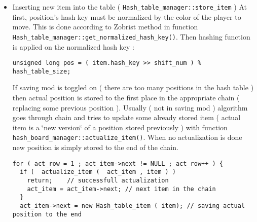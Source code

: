 \begin{itemize}
\item Inserting new item into the table ( {\tt Hash\_\-table\_\-manager::store\_\-item} ) At first, position's hash key must be normalized by the color of the player to move. This is done according to Zobrist method in function {\tt Hash\_\-table\_\-manager::get\_\-normalized\_\-hash\_\-key()}. Then hashing function is applied on the normalized hash key : 

\footnotesize\begin{verbatim}unsigned long pos = ( item.hash_key >> shift_num ) % hash_table_size;
\end{verbatim}
\normalsize
 If saving mod is toggled on ( there are too many positions in the hash table ) then actual position is stored to the first place in the appropriate chain ( replacing some previous position ). Usually ( not in saving mod ) algorithm goes through chain and tries to update some already stored item ( actual item is a \char`\"{}new version\char`\"{} of a position stored previously ) with function {\tt hash\_\-board\_\-manager::actualize\_\-item()}. When no actualization is done new position is simply stored to the end of the chain. 

\footnotesize\begin{verbatim}for ( act_row = 1 ; act_item->next != NULL ; act_row++ ) {
  if (  actualize_item (  act_item , item ) ) 
    return;    // successfull actualization
    act_item = act_item->next; // next item in the chain
  }
  act_item->next = new Hash_table_item ( item); // saving actual position to the end
\end{verbatim}
\normalsize
\end{itemize}


